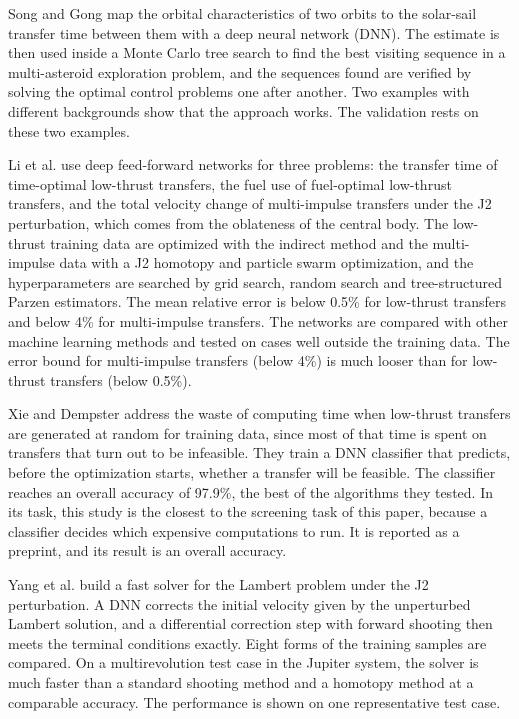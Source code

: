 Song and Gong \cite{song2019} map the orbital characteristics of two orbits to the solar-sail transfer time between them with a deep neural network (DNN). The estimate is then used inside a Monte Carlo tree search to find the best visiting sequence in a multi-asteroid exploration problem, and the sequences found are verified by solving the optimal control problems one after another. Two examples with different backgrounds show that the approach works. The validation rests on these two examples.

Li et al. \cite{li2020deep} use deep feed-forward networks for three problems: the transfer time of time-optimal low-thrust transfers, the fuel use of fuel-optimal low-thrust transfers, and the total velocity change of multi-impulse transfers under the J2 perturbation, which comes from the oblateness of the central body. The low-thrust training data are optimized with the indirect method and the multi-impulse data with a J2 homotopy and particle swarm optimization, and the hyperparameters are searched by grid search, random search and tree-structured Parzen estimators. The mean relative error is below 0.5\% for low-thrust transfers and below 4\% for multi-impulse transfers. The networks are compared with other machine learning methods and tested on cases well outside the training data. The error bound for multi-impulse transfers (below 4\%) is much looser than for low-thrust transfers (below 0.5\%).

Xie and Dempster \cite{xie2022} address the waste of computing time when low-thrust transfers are generated at random for training data, since most of that time is spent on transfers that turn out to be infeasible. They train a DNN classifier that predicts, before the optimization starts, whether a transfer will be feasible. The classifier reaches an overall accuracy of 97.9\%, the best of the algorithms they tested. In its task, this study is the closest to the screening task of this paper, because a classifier decides which expensive computations to run. It is reported as a preprint, and its result is an overall accuracy.

Yang et al. \cite{yang2022} build a fast solver for the Lambert problem under the J2 perturbation. A DNN corrects the initial velocity given by the unperturbed Lambert solution, and a differential correction step with forward shooting then meets the terminal conditions exactly. Eight forms of the training samples are compared. On a multirevolution test case in the Jupiter system, the solver is much faster than a standard shooting method and a homotopy method at a comparable accuracy. The performance is shown on one representative test case.

